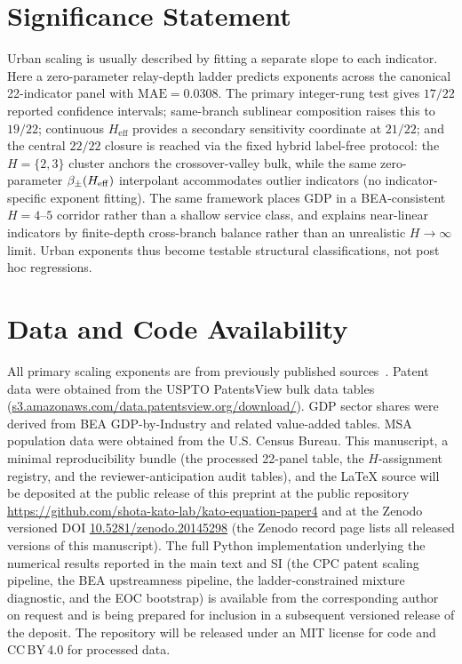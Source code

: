 \section*{Significance Statement}

Urban scaling is usually described by fitting a separate slope to each
indicator. Here a zero-parameter relay-depth ladder predicts exponents across
the canonical 22-indicator panel with $\mathrm{MAE}=0.0308$. The primary
integer-rung test gives $17/22$ reported confidence intervals;
same-branch sublinear composition raises this to $19/22$; continuous
$H_{\mathrm{eff}}$ provides a secondary sensitivity coordinate at $21/22$;
and the central $22/22$ closure is reached via the fixed hybrid
label-free protocol: the $H{=}\{2,3\}$ cluster anchors the
crossover-valley bulk, while the same zero-parameter
$\beta_{\pm}(H_{\mathrm{eff}})$ interpolant accommodates outlier indicators
(no indicator-specific exponent fitting). The same framework places GDP in a BEA-consistent
$H=4$--$5$ corridor rather than a shallow service class, and explains
near-linear indicators by finite-depth cross-branch balance rather than an
unrealistic $H\to\infty$ limit. Urban exponents thus become testable
structural classifications, not post hoc regressions.

\section*{Data and Code Availability}

All primary scaling exponents are from previously published
sources~\cite{Bettencourt2007,Bettencourt2013}.
Patent data were obtained from the USPTO PatentsView bulk data tables
(\href{https://s3.amazonaws.com/data.patentsview.org/download/}{s3.amazonaws.com/\allowbreak data.patentsview.org/\allowbreak download/}).
GDP sector shares were derived from BEA GDP-by-Industry and related
value-added tables.
MSA population data were obtained from the U.S. Census Bureau.
This manuscript, a minimal reproducibility bundle (the processed
22-panel table, the $H$-assignment registry, and the reviewer-anticipation
audit tables), and the LaTeX source will be deposited at the public release of this preprint at the public repository
\url{https://github.com/shota-kato-lab/kato-equation-paper4}
and at the Zenodo versioned DOI
\href{https://doi.org/10.5281/zenodo.20145298}{10.5281/zenodo.20145298}
(the Zenodo record page lists all released versions of this manuscript).
The full Python implementation underlying the numerical results reported
in the main text and SI (the CPC patent scaling pipeline, the BEA
upstreamness pipeline, the ladder-constrained mixture diagnostic, and
the EOC bootstrap) is available from the corresponding author on request
and is being prepared for inclusion in a subsequent versioned release of
the deposit. The repository will be released under an MIT license for code
and CC\,BY\,4.0 for processed data.

